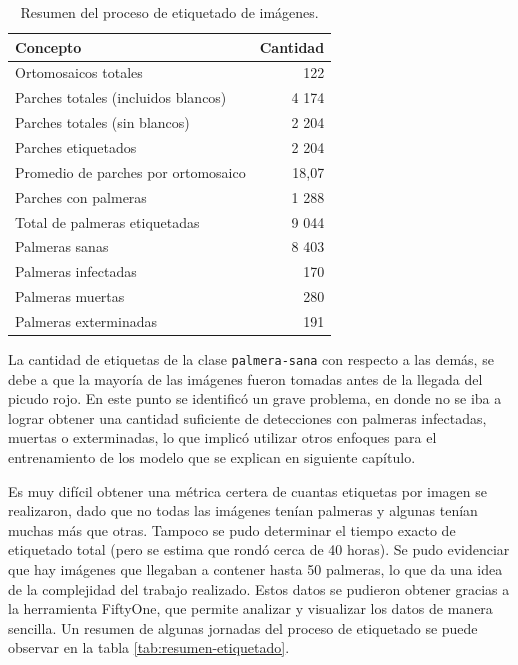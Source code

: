 \begin{table}[H]
  \centering
  \caption[Proceso de etiquetado]{Resumen del proceso de etiquetado de imágenes.}
  \begin{tabular}{l r}
    \toprule
    \textbf{Concepto}                   & \textbf{Cantidad} \\
    \midrule
    Ortomosaicos totales                & 122               \\
    Parches totales (incluidos blancos) & 4 174             \\
    Parches totales (sin blancos)       & 2 204             \\
    Parches etiquetados                 & 2 204             \\
    Promedio de parches por ortomosaico & 18,07             \\
    Parches con palmeras                & 1 288             \\
    Total de palmeras etiquetadas       & 9 044             \\
    Palmeras sanas                      & 8 403             \\
    Palmeras infectadas                 & 170               \\
    Palmeras muertas                    & 280               \\
    Palmeras exterminadas               & 191               \\
    \bottomrule
    \hline
  \end{tabular}
  \label{tab:resumen-imagenes-etiquetado}
\end{table}

La cantidad de etiquetas de la clase \texttt{palmera-sana} con respecto a las demás, se debe a que la mayoría de las imágenes fueron tomadas antes de la llegada del picudo rojo. En este punto se identificó un grave problema, en donde no se iba a lograr obtener una cantidad suficiente de detecciones con palmeras infectadas, muertas o exterminadas, lo que implicó utilizar otros enfoques para el entrenamiento de los modelo que se explican en siguiente capítulo.

Es muy difícil obtener una métrica certera de cuantas etiquetas por imagen se realizaron, dado que no todas las imágenes tenían palmeras y algunas tenían muchas más que otras. Tampoco se pudo determinar el tiempo exacto de etiquetado total (pero se estima que rondó cerca de 40 horas). Se pudo evidenciar que hay imágenes que llegaban a contener hasta 50 palmeras, lo que da una idea de la complejidad del trabajo realizado. Estos datos se pudieron obtener gracias a la herramienta FiftyOne, que permite analizar y visualizar los datos de manera sencilla. Un resumen de algunas jornadas del proceso de etiquetado se puede observar en la tabla \ref{tab:resumen-etiquetado}.


